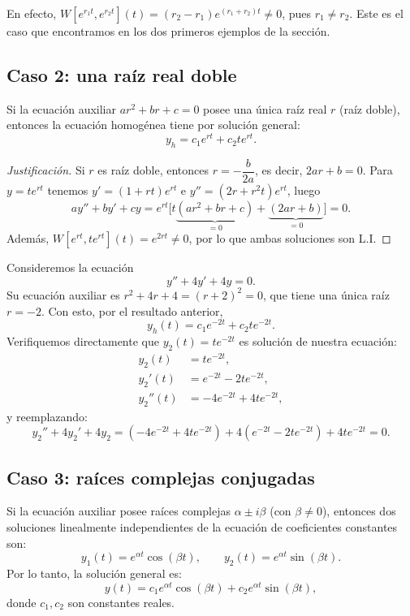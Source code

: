 En efecto, $W[e^{r_1t},e^{r_2t}](t)=(r_2-r_1)e^{(r_1+r_2)t}\neq 0$, pues $r_1\neq r_2$. Este es el caso que encontramos en los dos primeros ejemplos de la secci\'on.

\subsection*{Caso 2: una ra\'iz real doble}

\begin{theorem}
    Si la ecuaci\'on auxiliar $ar^2+br+c=0$ posee una \'unica ra\'iz real $r$ (ra\'iz doble), entonces la ecuaci\'on homog\'enea tiene por soluci\'on general:
    \[
    y_h=c_1e^{rt}+c_2te^{rt}.
    \]
\end{theorem}

\begin{proof}[Justificaci\'on]
    Si $r$ es ra\'iz doble, entonces $r=-\dfrac{b}{2a}$, es decir, $2ar+b=0$. Para $y=te^{rt}$ tenemos $y'=(1+rt)e^{rt}$ e $y''=(2r+r^2t)e^{rt}$, luego
    \[
    ay''+by'+cy=e^{rt}\big[t\underbrace{(ar^2+br+c)}_{=0}+\underbrace{(2ar+b)}_{=0}\big]=0.
    \]
    Adem\'as, $W[e^{rt},te^{rt}](t)=e^{2rt}\neq 0$, por lo que ambas soluciones son L.I.
\end{proof}

\begin{example}
    Consideremos la ecuaci\'on
    \[
    y''+4y'+4y=0.
    \]
    Su ecuaci\'on auxiliar es $r^2+4r+4=(r+2)^2=0$, que tiene una \'unica ra\'iz $r=-2$. Con esto, por el resultado anterior,
    \[
    y_h(t)=c_1e^{-2t}+c_2te^{-2t}.
    \]
    Verifiquemos directamente que $y_2(t)=te^{-2t}$ es soluci\'on de nuestra ecuaci\'on:
    \begin{align*}
        y_2(t)&=te^{-2t},\\
        y_2'(t)&=e^{-2t}-2te^{-2t},\\
        y_2''(t)&=-4e^{-2t}+4te^{-2t},
    \end{align*}
    y reemplazando:
    \[
    y_2''+4y_2'+4y_2=\left(-4e^{-2t}+4te^{-2t}\right)+4\left(e^{-2t}-2te^{-2t}\right)+4te^{-2t}=0.
    \]
\end{example}

\subsection*{Caso 3: ra\'ices complejas conjugadas}

\begin{theorem}
    Si la ecuaci\'on auxiliar posee ra\'ices complejas $\alpha\pm i\beta$ (con $\beta\neq 0$), entonces dos soluciones linealmente independientes de la ecuaci\'on de coeficientes constantes son:
    \[
    y_1(t)=e^{\alpha t}\cos(\beta t),\qquad y_2(t)=e^{\alpha t}\sin(\beta t).
    \]
    Por lo tanto, la soluci\'on general es:
    \[
    y(t)=c_1e^{\alpha t}\cos(\beta t)+c_2e^{\alpha t}\sin(\beta t),
    \]
    donde $c_1,c_2$ son constantes reales.
\end{theorem}

